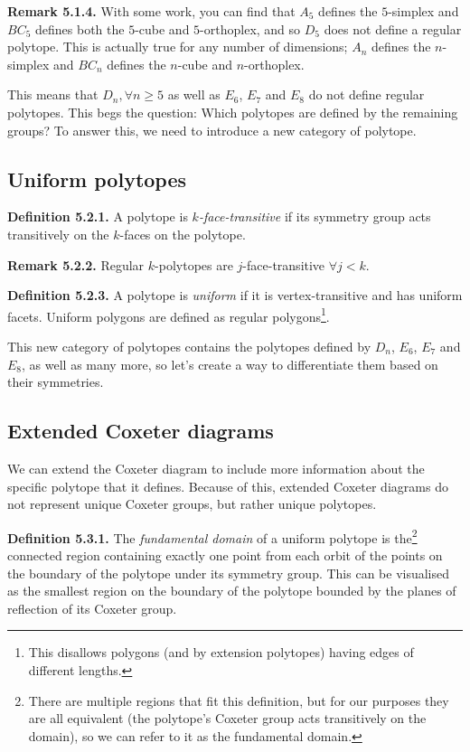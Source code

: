 \documentclass[../main.tex]{subfiles}
\begin{document}
\noindent\textbf{Remark 5.1.4.} With some work, you can find that $A_5$ defines the $5$-simplex and $BC_5$ defines both the $5$-cube and $5$-orthoplex, and so $D_5$ does not define a regular polytope. This is actually true for any number of dimensions; $A_n$ defines the $n$-simplex and $BC_n$ defines the $n$-cube and $n$-orthoplex.\newline

This means that $D_n, \forall n\geq5$ as well as $E_6$, $E_7$ and $E_8$  do not define regular polytopes. This begs the question: Which polytopes are defined by the remaining groups? To answer this, we need to introduce a new category of polytope.

\subsection{Uniform polytopes}

\noindent\textbf{Definition 5.2.1.} A polytope is \textit{$k$-face-transitive} if its symmetry group acts transitively on the $k$-faces on the polytope.\newline

\noindent\textbf{Remark 5.2.2.} Regular $k$-polytopes are $j$-face-transitive $\forall j<k$.\newline

\noindent\textbf{Definition 5.2.3.} A polytope is \textit{uniform} if it is vertex-transitive and has uniform facets. Uniform polygons are defined as regular polygons\footnote{This disallows polygons (and by extension polytopes) having edges of different lengths.}.\newline

This new category of polytopes contains the polytopes defined by $D_n$, $E_6$, $E_7$ and $E_8$, as well as many more, so let's create a way to differentiate them based on their symmetries.

\subsection{Extended Coxeter diagrams}

We can extend the Coxeter diagram to include more information about the specific polytope that it defines. Because of this, extended Coxeter diagrams do not represent unique Coxeter groups, but rather unique polytopes.\newline

\noindent\textbf{Definition 5.3.1.} The \textit{fundamental domain} of a uniform polytope is the\footnote{There are multiple regions that fit this definition, but for our purposes they are all equivalent (the polytope's Coxeter group acts transitively on the domain), so we can refer to it as the fundamental domain.} connected region containing exactly one point from each orbit of the points on the boundary of the polytope under its symmetry group. This can be visualised as the smallest region on the boundary of the polytope bounded by the planes of reflection of its Coxeter group.\newline
\end{document}
